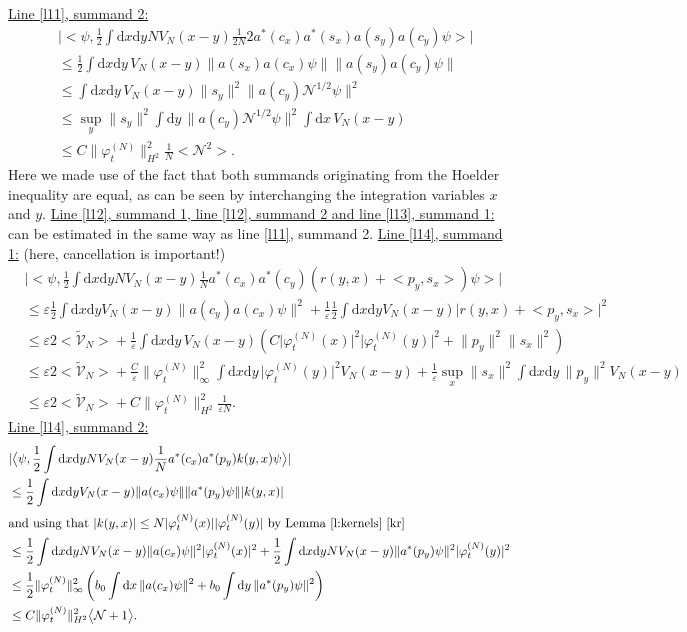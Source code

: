 \documentclass[11pt,a4paper,draft,DIV11]{scrartcl}	%
\newcommand{\di}{\textrm{d}}		%
\newcommand{\Ncal}{\mathcal{N}}		%
\newcommand{\tilV}{\tilde{\mathcal{V}}_N}		%
\newcommand{\estlist}[2]{\underline{Line \ref{l#1}, summand #2:}}
\newcommand{\nestlist}[2]{line \ref{l#1}, summand #2}
\newcommand{\Nestlist}[2]{Line \ref{l#1}, summand #2}
\newcommand{\scal}[2]{\big<#1,#2\big>} %
\newcommand{\norm}[1]{\lVert#1\rVert}	%
\newcommand{\ev}[1]{\big<#1\big>}	%
\newcommand{\ph}{\varphi_t^{(N)}}	%
\newcommand{\dxyNV}{\frac{1}{2}\int \di x\di y N V_N(x-y)} %
\newcommand{\dxyV}{\frac{1}{2}\int \di x\di y V_N(x-y)} %
\begin{document}
\estlist{11}{2}
\begin{align*}
& \lvert \scal{\psi}{\dxyNV \frac{1}{2N} 2 a^\ast(c_x) a^\ast(s_x) a(s_y) a(c_y)\psi}\rvert \\
& \leq \frac{1}{2}\int \di x\di y\, V_N(x-y) \norm{a(s_x) a(c_x) \psi} \norm{a(s_y) a(c_y)\psi} \\
& \leq \int \di x\di y\, V_N(x-y) \norm{s_y}^2 \norm{a(c_y) \Ncal^{1/2}\psi}^2\\
& \leq \sup_y \norm{s_y}^2 \int \di y\, \norm{a(c_y)\Ncal^{1/2}\psi}^2 \int \di x\, V_N(x-y)\\
& \leq C \norm{\ph}_{H^2}^2 \frac{1}{N}\ev{\Ncal^2}.
\end{align*}
Here we made use of the fact that both summands originating from the Hoelder inequality are equal, as can be seen by interchanging the integration variables $x$ and $y$.\newline
\underline{\Nestlist{12}{1}, \nestlist{12}{2} and \nestlist{13}{1}:} can be estimated in the same way as \nestlist{11}{2}.\newline
\estlist{14}{1} (here, cancellation is important!)
\begin{align*}
& \lvert \scal{\psi}{\dxyNV \frac{1}{N}a^\ast(c_x) a^\ast(c_y) \left( r(y,x)+\scal{p_y}{s_x} \right)\psi} \rvert \\
& \leq \varepsilon \dxyV \norm{a(c_y)a(c_x)\psi}^2 + \frac{1}{\varepsilon} \dxyV \lvert r(y,x)+\scal{p_y}{s_x} \rvert^2 \\
& \leq \varepsilon 2\ev{\tilV} + \frac{1}{\varepsilon} \int \di x\di y\, V_N(x-y) \left( C\lvert\ph(x)\rvert^2\lvert\ph(y)\rvert^2 +\norm{p_y}^2\norm{s_x}^2 \right) \\
& \leq \varepsilon 2\ev{\tilV} + \frac{C}{\varepsilon} \norm{\ph}_\infty^2 \int \di x \di y\, \lvert \ph(y)\rvert^2 V_N(x-y) + \frac{1}{\varepsilon} \sup_x\norm{s_x}^2 \int \di x\di y\, \norm{p_y}^2 V_N(x-y) \\
& \leq \varepsilon 2\ev{\tilV} + C\norm{\ph}_{H^2}^2 \frac{1}{\varepsilon N}.
\end{align*}
\estlist{14}{2}
\begin{align*}
& \lvert \scal{\psi}{\dxyNV \frac{1}{N} a^\ast(c_x) a^\ast(p_y) k(y,x)\psi} \rvert \\
& \leq \dxyV \norm{a(c_x)\psi} \norm{a^\ast(p_y)\psi} \lvert k(y,x)\rvert \\
\intertext{and using that $\lvert k(y,x)\rvert \leq N\lvert \ph(x)\rvert\lvert \ph(y)\rvert$ by Lemma \ref{l:kernels} \ref{kr}}
& \leq \dxyNV \norm{a(c_x)\psi}^2 \lvert\ph(x)\rvert^2 + \dxyNV \norm{a^\ast(p_y)\psi}^2 \lvert \ph(y)\rvert^2\\
& \leq \frac{1}{2} \norm{\ph}_\infty^2 \left( b_0 \int \di x\,\norm{a(c_x)\psi}^2 + b_0 \int \di y\,\norm{a^\ast(p_y)\psi}^2 \right) \\
& \leq C \norm{\ph}_{H^2}^2 \ev{\Ncal+1}.
\end{align*}
\end{document}
